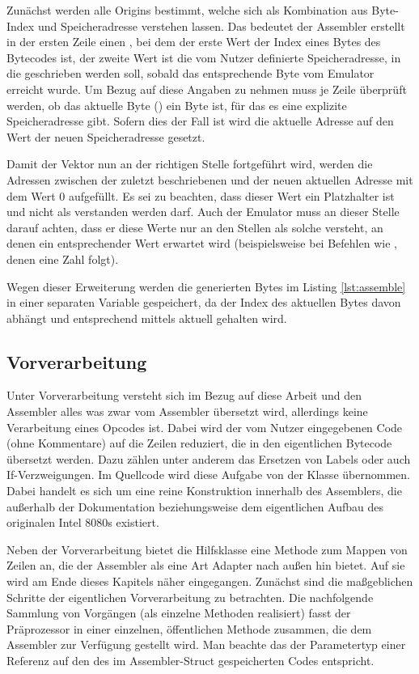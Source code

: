Zunächst werden alle Origins bestimmt, welche sich als Kombination aus Byte-Index und Speicheradresse verstehen lassen. Das bedeutet der Assembler erstellt in der ersten Zeile einen , bei dem der erste Wert der Index eines Bytes des Bytecodes ist, der zweite Wert ist die vom Nutzer definierte Speicheradresse, in die geschrieben werden soll, sobald das entsprechende Byte vom Emulator erreicht wurde. Um Bezug auf diese Angaben zu nehmen muss je Zeile überprüft werden, ob das aktuelle Byte () ein Byte ist, für das es eine explizite Speicheradresse gibt. Sofern dies der Fall ist wird die aktuelle Adresse auf den Wert der neuen Speicheradresse gesetzt. 

Damit der Vektor nun an der richtigen Stelle fortgeführt wird, werden die Adressen zwischen der zuletzt beschriebenen und der neuen aktuellen Adresse mit dem Wert 0 aufgefüllt. Es sei zu beachten, dass dieser Wert ein Platzhalter ist und nicht als \grqq{} verstanden werden darf. Auch der Emulator muss an dieser Stelle darauf achten, dass er diese Werte nur an den Stellen als solche versteht, an denen ein entsprechender Wert erwartet wird (beispielsweise bei Befehlen wie , denen eine Zahl folgt).

Wegen dieser Erweiterung werden die generierten Bytes im Listing \ref{lst:assemble} in einer separaten Variable gespeichert, da der Index des aktuellen Bytes davon abhängt und entsprechend mittels
aktuell gehalten wird.

\subsection{Vorverarbeitung}\label{chap:preprocessor}

Unter Vorverarbeitung versteht sich im Bezug auf diese Arbeit und den Assembler alles was zwar vom Assembler übersetzt wird, allerdings keine Verarbeitung eines Opcodes ist. Dabei wird der vom Nutzer eingegebenen Code (ohne Kommentare) auf die Zeilen reduziert, die in den eigentlichen Bytecode übersetzt werden. Dazu zählen unter anderem das Ersetzen von Labels oder auch If-Verzweigungen. Im Quellcode wird diese Aufgabe von der Klasse  übernommen. Dabei handelt es sich um eine reine Konstruktion innerhalb des Assemblers, die außerhalb der Dokumentation beziehungsweise dem eigentlichen Aufbau des originalen Intel 8080s existiert.

Neben der Vorverarbeitung bietet die Hilfsklasse eine Methode zum Mappen von Zeilen an, die der Assembler als eine Art Adapter nach außen hin bietet. Auf sie wird am Ende dieses Kapitels näher eingegangen. Zunächst sind die maßgeblichen Schritte der eigentlichen Vorverarbeitung zu betrachten. Die nachfolgende Sammlung von Vorgängen (als einzelne Methoden realisiert) fasst der Präprozessor in einer einzelnen, öffentlichen Methode  zusammen, die dem Assembler zur Verfügung gestellt wird. Man beachte das der Parametertyp einer Referenz auf den des im Assembler-Struct gespeicherten Codes entspricht.

